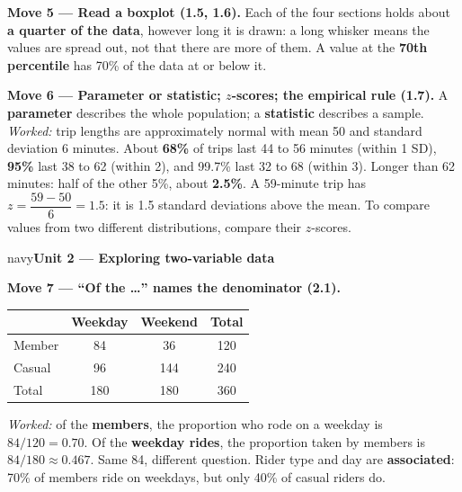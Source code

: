 \documentclass[12pt]{article}
\newcommand{\sghead}[2][10]{%
  \vspace{0.13in}
  \boxguard[#1]
  \begin{headlinebox}{navy}\color{white}\bfseries\small #2\end{headlinebox}
  \vspace{0.09in}}
\begin{document}
\vspace{3pt}
\textbf{Move 5 --- Read a boxplot (1.5, 1.6).} Each of the four sections holds about
\textbf{a quarter of the data}, however long it is drawn: a long whisker means the values are
spread out, not that there are more of them. A value at the \textbf{70th percentile} has 70\% of
the data at or below it.

\vspace{3pt}
\boxguard[7]
\textbf{Move 6 --- Parameter or statistic; $z$-scores; the empirical rule (1.7).} A
\textbf{parameter} describes the whole population; a \textbf{statistic} describes a sample.
\emph{Worked:} trip lengths are approximately normal with mean 50 and standard deviation 6
minutes. About \textbf{68\%} of trips last 44 to 56 minutes (within 1 SD), \textbf{95\%} last 38
to 62 (within 2), and 99.7\% last 32 to 68 (within 3). Longer than 62 minutes: half of the other
5\%, about \textbf{2.5\%}. A 59-minute trip has $z = \dfrac{59 - 50}{6} = 1.5$: it is 1.5
standard deviations above the mean. To compare values from two different distributions, compare
their $z$-scores.

\normalsize
\sghead{Unit 2 --- Exploring two-variable data}

\small
\boxguard[9]
\textbf{Move 7 --- ``Of the \ldots'' names the denominator (2.1).}

\vspace{2pt}
\noindent\begin{minipage}[c]{0.42\linewidth}\centering\footnotesize
\renewcommand{\arraystretch}{1.15}
\begin{tabular}{@{} l c c c @{}}
\rowcolor{sky}
 & \textbf{Weekday} & \textbf{Weekend} & \textbf{Total} \\
\midrule
Member & 84 & 36  & 120 \\
Casual & 96 & 144 & 240 \\
\midrule
Total  & 180 & 180 & 360 \\
\end{tabular}
\end{minipage}\hfill
\begin{minipage}[c]{0.55\linewidth}\raggedright
\emph{Worked:} of the \textbf{members}, the proportion who rode on a weekday is $84/120 = 0.70$.
Of the \textbf{weekday rides}, the proportion taken by members is $84/180 \approx 0.467$. Same
84, different question. Rider type and day are \textbf{associated}: 70\% of members ride on
weekdays, but only 40\% of casual riders do.
\end{minipage}
\end{document}
